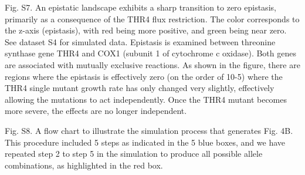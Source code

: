 Fig. S7. An epistatic landscape exhibits a sharp transition to zero
epistasis, primarily as a consequence of the THR4 flux
restriction. The color corresponds to the z-axis (epistasis), with red
being more positive, and green being near zero. See dataset S4 for
simulated data. Epistasis is examined between threonine synthase gene
THR4 and COX1 (subunit 1 of cytochrome c oxidase). Both genes are
associated with mutually exclusive reactions. As shown in the figure,
there are regions where the epistasis is effectively zero (on the
order of 10-5) where the THR4 single mutant growth rate has only
changed very slightly, effectively allowing the mutations to act
independently. Once the THR4 mutant becomes more severe, the effects
are no longer independent.

Fig. S8. A flow chart to illustrate the simulation process that
generates Fig. 4B. This procedure included 5 steps as indicated in the
5 blue boxes, and we have repeated step 2 to step 5 in the simulation
to produce all possible allele combinations, as highlighted in the red
box.
